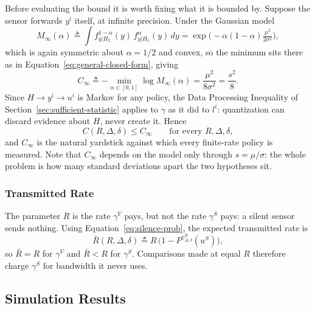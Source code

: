 \documentclass[11pt]{article}
\begin{document}
Before evaluating the bound it is worth fixing what it is bounded by.
Suppose the sensor forwards $y^i$ itself, at infinite precision. Under the
Gaussian model
\begin{equation}
M_\infty(\alpha) \triangleq \int f_{y|H_2}^{1-\alpha}(y)\,f_{y|H_1}^{\alpha}(y)\,dy
= \exp\!\Big(-\alpha(1-\alpha)\tfrac{\mu^2}{2\sigma^2}\Big),
\label{eq:M-infty}
\end{equation}
which is again symmetric about $\alpha=1/2$ and convex, so the minimum sits
there as in Equation~\eqref{eq:general-closed-form}, giving
\begin{equation}
C_\infty \triangleq -\min_{\alpha\in[0,1]}\log M_\infty(\alpha)
= \frac{\mu^2}{8\sigma^2} = \frac{s^2}{8}.
\label{eq:ceiling}
\end{equation}
Since $H \to y^i \to u^i$ is Markov for any policy, the Data Processing
Inequality of Section~\ref{sec:sufficient-statistic} applies to $\gamma$ as
it did to $l^i$: quantization can discard evidence about $H$, never create
it. Hence
\begin{equation}
C(R,\Delta,\delta) \le C_\infty \qquad \text{for every } R,\Delta,\delta,
\label{eq:ceiling-bound}
\end{equation}
and $C_\infty$ is the natural yardstick against which every finite-rate
policy is measured. Note that $C_\infty$ depends on the model only through
$s = \mu/\sigma$: the whole problem is how many standard deviations apart
the two hypotheses sit.

\subsubsection*{Transmitted Rate}

The parameter $R$ is the rate $\gamma^V$ pays, but not the rate $\gamma^S$
pays: a silent sensor sends nothing. Using
Equation~\eqref{eq:silence-prob}, the expected transmitted rate is
\begin{equation}
\bar R(R,\Delta,\delta) \triangleq R\,\Big(1 - P^{\gamma^R_{\Delta,\delta}}(u^S)\Big),
\label{eq:mean-rate}
\end{equation}
so $\bar R = R$ for $\gamma^V$ and $\bar R < R$ for $\gamma^S$. Comparisons
made at equal $R$ therefore charge $\gamma^S$ for bandwidth it never uses.

\subsection*{Simulation Results}
\label{sec:sim-results}
\end{document}
